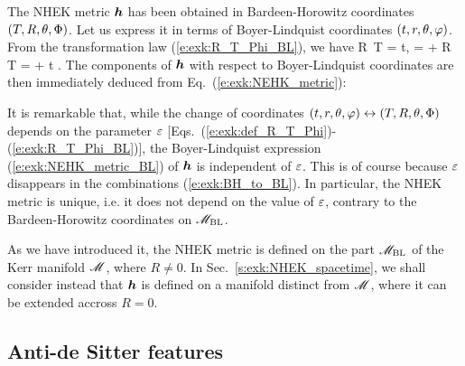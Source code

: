 The NHEK metric $\bm{h}$ has been obtained in Bardeen-Horowitz coordinates
$(T,R,\theta,\Phi)$. Let us express it in terms of Boyer-Lindquist coordinates
$(t,r,\theta,\varphi)$. From the transformation law (\ref{e:exk:R_T_Phi_BL}), we have
\be \label{e:exk:BH_to_BL}
    R \,\dd T =  \dd t,\qquad
     =  \qand
    \dd\Phi + R \, \dd T = \dd\ph +  \dd t .
\ee
The components of $\bm{h}$ with respect to Boyer-Lindquist coordinates are then
immediately deduced from Eq.~(\ref{e:exk:NEHK_metric}):
\be \label{e:exk:NEHK_metric_BL}
\ee
\begin{remark}
It is remarkable that, while
the change of coordinates $(t,r,\theta,\varphi)\leftrightarrow (T,R,\theta,\Phi)$ depends on the
parameter $\varepsilon$ [Eqs.~(\ref{e:exk:def_R_T_Phi})-(\ref{e:exk:R_T_Phi_BL})],
the Boyer-Lindquist expression (\ref{e:exk:NEHK_metric_BL}) of $\bm{h}$ is
independent of $\varepsilon$. This is of course because $\varepsilon$ disappears in
the combinations (\ref{e:exk:BH_to_BL}).
In particular, the NHEK metric is unique, i.e. it does not depend on the value
of $\varepsilon$, contrary to the Bardeen-Horowitz coordinates on
$\mathscr{M}_{\rm BL}$.
\end{remark}

\begin{remark}
As we have introduced it, the NHEK metric is defined on the part $\mathscr{M}_{\rm BL}$
of the Kerr manifold $\mathscr{M}$, where $R\neq 0$.
In Sec.~\ref{s:exk:NHEK_spacetime},
we shall consider instead that $\bm{h}$ is defined
on a manifold distinct from $\mathscr{M}$, where it can be extended accross $R=0$.
\end{remark}

\subsection{Anti-de Sitter features}

